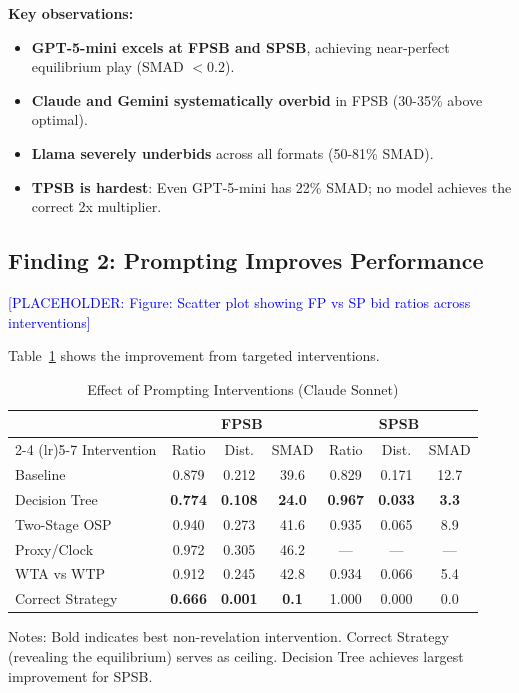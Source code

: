 \documentclass[12pt]{article}
\newcommand{\placeholder}[1]{\textcolor{blue}{[PLACEHOLDER: #1]}}
\begin{document}
\textbf{Key observations:}
\begin{itemize}
    \item \textbf{GPT-5-mini excels at FPSB and SPSB}, achieving near-perfect equilibrium play (SMAD $< 0.2$).
    \item \textbf{Claude and Gemini systematically overbid} in FPSB (30-35\% above optimal).
    \item \textbf{Llama severely underbids} across all formats (50-81\% SMAD).
    \item \textbf{TPSB is hardest}: Even GPT-5-mini has 22\% SMAD; no model achieves the correct 2x multiplier.
\end{itemize}

\subsection{Finding 2: Prompting Improves Performance}

\placeholder{Figure: Scatter plot showing FP vs SP bid ratios across interventions}

Table~\ref{tab:intervention_effects} shows the improvement from targeted interventions.

\begin{table}[h]
\centering
\caption{Effect of Prompting Interventions (Claude Sonnet)}
\label{tab:intervention_effects}
\begin{tabular}{lcccccc}
\toprule
& \multicolumn{3}{c}{\textbf{FPSB}} & \multicolumn{3}{c}{\textbf{SPSB}} \\
\cmidrule(lr){2-4} \cmidrule(lr){5-7}
Intervention & Ratio & Dist. & SMAD & Ratio & Dist. & SMAD \\
\midrule
Baseline & 0.879 & 0.212 & 39.6 & 0.829 & 0.171 & 12.7 \\
Decision Tree & \textbf{0.774} & \textbf{0.108} & \textbf{24.0} & \textbf{0.967} & \textbf{0.033} & \textbf{3.3} \\
Two-Stage OSP & 0.940 & 0.273 & 41.6 & 0.935 & 0.065 & 8.9 \\
Proxy/Clock & 0.972 & 0.305 & 46.2 & --- & --- & --- \\
WTA vs WTP & 0.912 & 0.245 & 42.8 & 0.934 & 0.066 & 5.4 \\
\midrule
Correct Strategy & \textbf{0.666} & \textbf{0.001} & \textbf{0.1} & 1.000 & 0.000 & 0.0 \\
\bottomrule
\end{tabular}
\smallskip
\begin{minipage}{0.95\textwidth}
\footnotesize
Notes: Bold indicates best non-revelation intervention. Correct Strategy (revealing the equilibrium) serves as ceiling. Decision Tree achieves largest improvement for SPSB.
\end{minipage}
\end{table}
\end{document}
